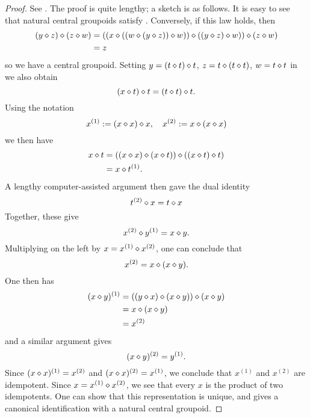 \begin{proof}
  See \cite[Theorem 5]{knuth}.  The proof is quite lengthy; a sketch is as follows. It is easy to see that natural central groupoids satisfy .  Conversely, if this law holds, then
\begin{align*}
  (y \diamond z) \diamond (z \diamond w) &= (( x \diamond ((w \diamond (y \diamond z)) \diamond w)) \diamond ((y \diamond z) \diamond w)) \diamond (z \diamond w)\\
  &= z
\end{align*}
so we have a central groupoid.  Setting $y = (t \diamond t) \diamond t$, $z = t \diamond (t \diamond t)$, $w = t \diamond t$ in  we also obtain
$$ (x \diamond t) \diamond t = (t \diamond t) \diamond t.$$
Using the notation
$$ x^{(1)} := (x \diamond x) \diamond x, \quad x^{(2)} := x \diamond (x \diamond x)$$
we then have
\begin{align*}
  x \diamond t &= ((x \diamond x) \diamond (x \diamond t)) \diamond ((x \diamond t) \diamond t) \\
  &= x \diamond t^{(1)}.
\end{align*}
A lengthy computer-assisted argument then gave the dual identity
$$ t^{(2)} \diamond x = t \diamond x$$
Together, these give
$$ x^{(2)} \diamond y^{(1)} = x \diamond y.$$
Multiplying on the left by $x = x^{(1)}\diamond x^{(2)}$, one can conclude that
$$ x^{(2)} = x \diamond (x \diamond y).$$
One then has
\begin{align*}
  (x \diamond y)^{(1)} &= ((y \diamond x) \diamond (x \diamond y)) \diamond (x \diamond y) \\
&= x \diamond (x \diamond y) \\
&= x^{(2)}
\end{align*}
and a similar argument gives
$$ (x \diamond y)^{(2)} = y^{(1)}.$$
Since $(x \diamond x)^{(1)} = x^{(2)}$ and $(x \diamond x)^{(2)} = x^{(1)}$, we conclude that $x^{(1)}$ and $x^{(2)}$ are idempotent.  Since $x = x^{(1)} \diamond x^{(2)}$, we see that every $x$ is the product of two idempotents.  One can show that this representation is unique, and gives a canonical identification with a natural central groupoid.
\end{proof}
